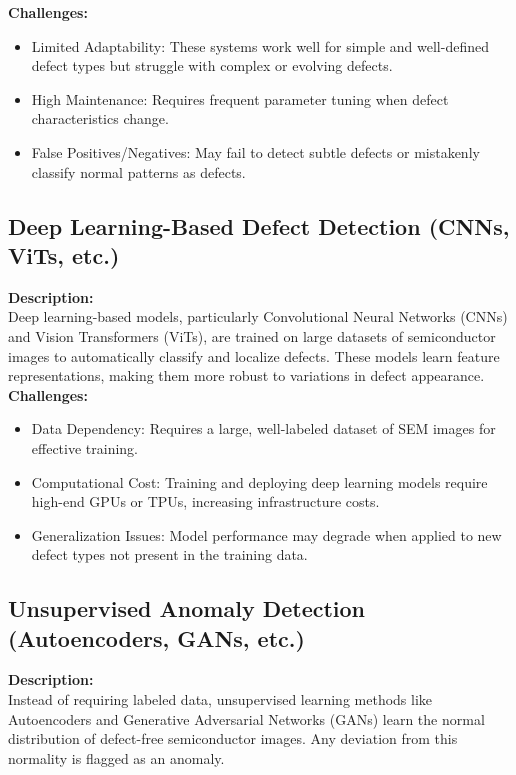 \documentclass[12pt,oneside,letterpaper,english]{article}
\begin{document}
\textbf{Challenges:}
\begin{itemize}
\item 	Limited Adaptability: These systems work well for simple and well-defined defect types but struggle with complex or evolving defects.
\item	High Maintenance: Requires frequent parameter tuning when defect characteristics change.
\item	False Positives/Negatives: May fail to detect subtle defects or mistakenly classify normal patterns as defects.
\end{itemize}
\subsection{Deep Learning-Based Defect Detection (CNNs, ViTs, etc.)}
\textbf{Description:}\\
Deep learning-based models, particularly Convolutional Neural Networks (CNNs) and Vision Transformers (ViTs), are trained on large datasets of semiconductor images to automatically classify and localize defects. These models learn feature representations, making them more robust to variations in defect appearance.\\

\textbf{Challenges:}
\begin{itemize}
\item	Data Dependency: Requires a large, well-labeled dataset of SEM images for effective training.
\item	Computational Cost: Training and deploying deep learning models require high-end GPUs or TPUs, increasing infrastructure costs.
\item	Generalization Issues: Model performance may degrade when applied to new defect types not present in the training data.

\end{itemize}

\subsection{Unsupervised Anomaly Detection (Autoencoders, GANs, etc.)}
\textbf{Description:}\\
Instead of requiring labeled data, unsupervised learning methods like Autoencoders and Generative Adversarial Networks (GANs) learn the normal distribution of defect-free semiconductor images. Any deviation from this normality is flagged as an anomaly.\\
\end{document}
